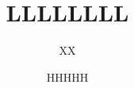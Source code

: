 \documentclass{beamer}
\title[LLLLLLLL] 
{LLLLLLLL}
\author[]{XX}
\institute{YY \ UU}
\date[]{HHHHH}
\begin{document}
\begin{frame}
  \titlepage
\end{frame}
\end{document}
